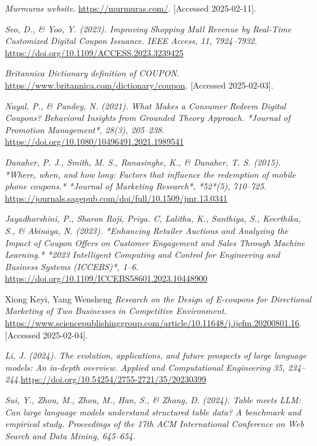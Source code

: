\documentclass[licencjacka,en]{pracamgr}
\begin{document}
\begin{thebibliography}{199}

\raggedright

\textit{Murmuras website}.  
\url{https://murmuras.com/}.  
[Accessed 2025-02-11].

\textit{Seo, D., \& Yoo, Y. (2023). Improving Shopping Mall Revenue by Real-Time Customized Digital Coupon Issuance. IEEE Access, 11, 7924–7932.}
\url{https://doi.org/10.1109/ACCESS.2023.3239425}

\textit{Britannica Dictionary definition of COUPON}.
\url{https://www.britannica.com/dictionary/coupon}.
[Accessed 2025-02-03].

\textit{Nayal, P., \& Pandey, N. (2021). What Makes a Consumer Redeem Digital Coupons? Behavioral Insights from Grounded Theory Approach. *Journal of Promotion Management*, 28(3), 205–238.}
\url{https://doi.org/10.1080/10496491.2021.1989541}

\textit{Danaher, P. J., Smith, M. S., Ranasinghe, K., \& Danaher, T. S. (2015). *Where, when, and how long: Factors that influence the redemption of mobile phone coupons.* *Journal of Marketing Research*, *52*(5), 710--725.}
\url{https://journals.sagepub.com/doi/full/10.1509/jmr.13.0341}

\textit{Jayadharshini, P., Sharon Roji, Priya. C, Lalitha, K., Santhiya, S., Keerthika, S., \& Abinaya, N. (2023). *Enhancing Retailer Auctions and Analyzing the Impact of Coupon Offers on Customer Engagement and Sales Through Machine Learning.* *2023 Intelligent Computing and Control for Engineering and Business Systems (ICCEBS)*, 1–6. }
\url{https://doi.org/10.1109/ICCEBS58601.2023.10448900}

Xiong Keyi, Yang Wensheng
\textit{Research on the Design of E-coupons for Directional Marketing of Two Businesses in Competitive Environment}.
\url{https://www.sciencepublishinggroup.com/article/10.11648/j.ijefm.20200801.16}.
[Accessed 2025-02-04].

\textit{Li, J. (2024). The evolution, applications, and future prospects of large language models: An in-depth overview. Applied and Computational Engineering 35, 234–244.}\url{https://doi.org/10.54254/2755-2721/35/20230399}

\textit{Sui, Y., Zhou, M., Zhou, M., Han, S., \& Zhang, D. (2024). Table meets LLM: Can large language models understand structured table data? A benchmark and empirical study. Proceedings of the 17th ACM International Conference on Web Search and Data Mining, 645--654.}


\end{thebibliography}
\end{document}
